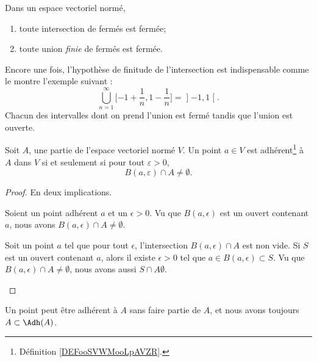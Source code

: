 \begin{proposition}
	Dans un espace vectoriel normé,
	\begin{enumerate}
		\item
		      toute intersection de fermés est fermée;
		\item
		      toute union \emph{finie} de fermés est fermée.
	\end{enumerate}
\end{proposition}
Encore une fois, l'hypothèse de finitude de l'intersection est indispensable comme le montre l'exemple suivant :
\begin{equation}
	\bigcup_{n=1}^{\infty}\mathopen[ -1+\frac{1}{ n } , 1-\frac{1}{ n } \mathclose]=\mathopen] -1 , 1 \mathclose[.
\end{equation}
Chacun des intervalles dont on prend l'union est fermé tandis que l'union est ouverte.

\begin{lemma}       \label{LEMooHPQTooHKdoiL}
	Soit \( A\), une partie de l'espace vectoriel normé \( V\). Un point \( a\in V\) est adhérent\footnote{Définition \ref{DEFooSVWMooLpAVZR}.} à \( A\) dans \( V\) si et seulement si pour tout \( \varepsilon>0\),
	\begin{equation}
		B(a,\varepsilon)\cap A\neq\emptyset.
	\end{equation}
\end{lemma}

\begin{proof}
	En deux implications.
	\begin{subproof}
		\spitem[\( \Rightarrow\)]
		Soient un point adhérent \( a\) et un \( \epsilon>0\). Vu que \( B(a,\epsilon)\) est un ouvert contenant \( a\), nous avons \( B(a,\epsilon)\cap A\neq\emptyset\).

		\spitem[\( \Leftarrow\)]
		Soit un point \( a\) tel que pour tout \( \epsilon\), l'intersection \( B(a,\epsilon)\cap A\) est non vide. Si \( S\) est un ouvert contenant \( a\), alors il existe \( \epsilon>0\) tel que \( a\in B(a,\epsilon)\subset S\). Vu que \( B(a,\epsilon)\cap A\neq\emptyset\), nous avons aussi \( S\cap A\emptyset\).
	\end{subproof}
\end{proof}

Un point peut être adhérent à \( A\) sans faire partie de \( A\), et nous avons toujours \( A\subset\Adh(A)\).

